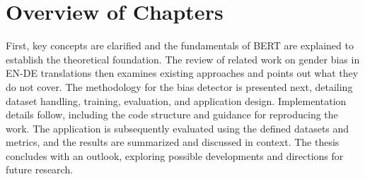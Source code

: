 \section{Overview of Chapters}
    First, key concepts are clarified and the fundamentals of BERT are explained to establish the theoretical foundation. The review of related work on gender bias in EN-DE translations then examines existing approaches and points out what they do not cover. The methodology for the bias detector is presented next, detailing dataset handling, training, evaluation, and application design. Implementation details follow, including the code structure and guidance for reproducing the work. The application is subsequently evaluated using the defined datasets and metrics, and the results are summarized and discussed in context. The thesis concludes with an outlook, exploring possible developments and directions for future research.